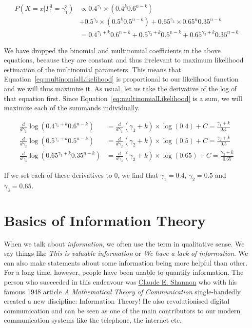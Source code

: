 \begin{align}
P(X=x| \Gamma_{1}^{3}= \gamma_{1}^{3}) &\propto 0.4^{\gamma_{1}} \times (0.4^{k}0.6^{n-k}) \\
&+ 0.5^{\gamma_{2}} \times (0.5^{k}0.5^{n-k}) + 0.65^{\gamma_{3}} \times 0.65^{n}0.35^{n-k} \nonumber \\
&= 0.4^{\gamma_{1}+k}0.6^{n-k} + 0.5^{\gamma_{2}+k}0.5^{n-k} + 0.65^{\gamma_{3}+k}0.35^{n-k} \label{eq:multinomialLikelihood}
\end{align}

We have dropped the binomial and multinomial coefficients in the above equations, because they are constant and thus irrelevant to maximum likelihood estimation
of the multinomial parameters. This means that Equation~\eqref{eq:multinomialLikelihood} is proportional to our likelihood function and we will thus
maximize it. As usual, let us take the derivative of the log of that equation first. Since Equation~\eqref{eq:multinomialLikelihood} is a sum, we will maximize
each of the summands individually.

\begin{align}
\frac{d}{d\gamma_{1}} \log(0.4^{\gamma_{1}+k}0.6^{n-k}) &= \frac{d}{d\gamma_{1}} (\gamma_{1} + k)\times \log(0.4) + C = \frac{\gamma_{1} + k}{0.4} \\
\frac{d}{d\gamma_{2}} \log(0.5^{\gamma_{1}+k}0.5^{n-k}) &= \frac{d}{d\gamma_{2}} (\gamma_{2} + k)\times \log(0.5) + C = \frac{\gamma_{2} + k}{0.5} \\
\frac{d}{d\gamma_{3}} \log(0.65^{\gamma_{3}+k}0.35^{n-k}) &= \frac{d}{d\gamma_{3}} (\gamma_{3} + k)\times \log(0.65) + C = \frac{\gamma_{3} + k}{0.65}
\end{align}

If we set each of these derivatives to 0, we find that $ \gamma_{1} = 0.4 $, $ \gamma_{2} = 0.5 $ and $ \gamma_{3} = 0.65 $.

\section{Basics of Information Theory}

When we talk about \textit{information}, we often use the term in qualitative sense. We say things like \textit{This is valuable information} or 
\textit{We have a lack of information}. We can also make statements about some information being more helpful than other. For a long time, however,
people have been unable to quantify information. The person who succeeded in this endeavour was \href{https://en.wikipedia.org/wiki/Claude_Shannon}{Claude E. Shannon}
who with his famous 1948 article \textit{A Mathematical Theory of Communication} single-handedly created a new discipline: Information Theory! He also revolutionised
digital communication and can be seen as one of the main contributors to our modern communication systems like the telephone, the internet etc. 

